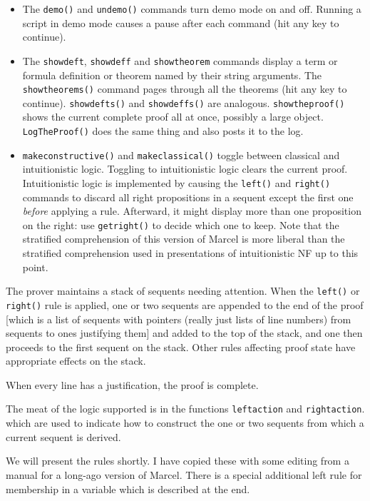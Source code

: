 \documentclass{article}
\begin{document}
\begin{itemize}
\item The {\tt demo()} and {\tt undemo()} commands turn demo mode on and off.  Running a script in demo mode causes a pause after each command (hit any key to continue).

\item The {\tt showdeft}, {\tt showdeff} and {\tt showtheorem} commands display a term or formula definition or theorem named by their string arguments.
The {\tt showtheorems()} command pages through all the theorems (hit any key to continue).  {\tt showdefts()} and {\tt showdeffs()} are analogous.
{\tt showtheproof()} shows the current complete proof all at once, possibly a large object.  {\tt LogTheProof()} does the same thing and also posts it to the log.

\item {\tt makeconstructive()} and {\tt makeclassical()} toggle between classical and intuitionistic logic.  Toggling to intuitionistic logic clears the current proof.  Intuitionistic logic is implemented by causing the {\tt left()} and {\tt right()} commands to discard all right propositions in a sequent except the first one {\em before\/} applying a rule.  Afterward, it might display more than one proposition on the right:  use {\tt getright()} to decide which one to keep.  Note that the stratified comprehension of this version of Marcel is more liberal than the stratified comprehension used in presentations of intuitionistic NF up to this point.
\end{itemize}

The prover maintains a stack of sequents needing attention.  When the {\tt left()} or {\tt right()} rule is applied, one or two sequents are appended to the end of the proof [which is a list of sequents with pointers (really just lists of line numbers) from sequents to ones justifying them] and added to the top of the stack, and one then proceeds to the first sequent on the stack.  Other rules affecting proof state have appropriate effects on the stack.

When every line has a justification, the proof is complete.

The meat of the logic supported is in the functions {\tt leftaction} and {\tt rightaction}. which are used to indicate how to construct the one or two sequents from which a current sequent is derived.

We will present the rules shortly.  I have copied these with some editing from a manual for a long-ago version of Marcel.  There is a special additional left rule
for membership in a variable which is described at the end.
\end{document}

